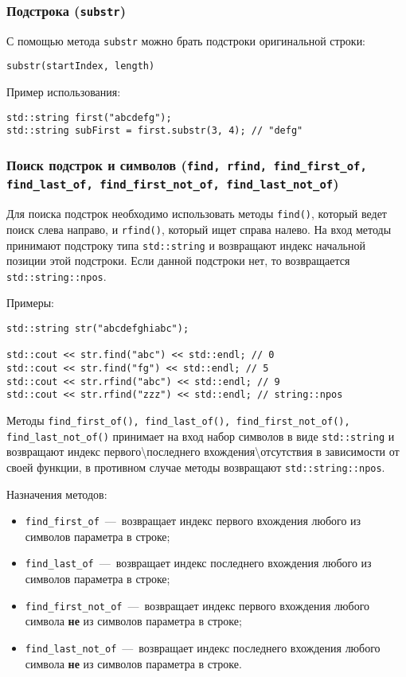 \subsubsection{Подстрока (\texttt{substr})}
С помощью метода \lstinline{substr} можно брать подстроки оригинальной строки:

\lstinline|substr(startIndex, length)|

Пример использования:
\begin{lstlisting}
std::string first("abcdefg");
std::string subFirst = first.substr(3, 4); // "defg"
\end{lstlisting}

\subsubsection{Поиск подстрок и символов (\texttt{find, rfind, find\_first\_of, \\find\_last\_of, find\_first\_not\_of, find\_last\_not\_of})}

Для поиска подстрок необходимо использовать методы \lstinline|find()|, который ведет поиск слева направо, и \lstinline|rfind()|, который ищет справа налево. На вход методы принимают подстроку типа \lstinline|std::string| и возвращают индекс начальной позиции этой подстроки. Если данной подстроки нет, то возвращается \lstinline|std::string::npos|.

Примеры:
\begin{lstlisting}
std::string str("abcdefghiabc");

std::cout << str.find("abc") << std::endl; // 0
std::cout << str.find("fg") << std::endl; // 5
std::cout << str.rfind("abc") << std::endl; // 9
std::cout << str.rfind("zzz") << std::endl; // string::npos
\end{lstlisting}

Методы \lstinline|find_first_of(), find_last_of(), find_first_not_of(), find_last_not_of()| принимает на вход набор символов в виде \lstinline|std::string| и возвращают индекс первого\textbackslash последнего вхождения\textbackslash отсутствия в зависимости от своей функции, в противном случае методы возвращают \lstinline|std::string::npos|.

Назначения методов:
\begin{itemize}
    \item \lstinline|find_first_of|~---~возвращает индекс первого вхождения любого из символов параметра в строке;
    \item \lstinline|find_last_of|~---~возвращает индекс последнего вхождения любого из символов параметра в строке;
    \item \lstinline|find_first_not_of|~---~возвращает индекс первого вхождения любого символа \textbf{не} из символов параметра в строке;
    \item \lstinline|find_last_not_of|~---~возвращает индекс последнего вхождения любого символа \textbf{не} из символов параметра в строке.
\end{itemize}

